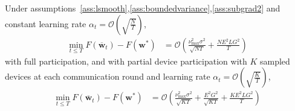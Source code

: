 
\begin{thm}
	Under assumptions~\ref{ass:lsmooth},\ref{ass:boundedvariance},\ref{ass:subgrad2} and constant learning
	rate $\alpha_{t}=\mathcal{O}(\sqrt{\frac{N}{T}})$, 
	\begin{align*}
	\min_{t\leq T}F(\overline{\mathbf{w}}_{t})-F(\mathbf{w}^{\ast}) & =\mathcal{O}\left(\frac{\nu_{\max}^{2}\sigma^{2}}{\sqrt{NT}}+\frac{NE^{2}LG^{2}}{T}\right)
	\end{align*}
	with full participation, and with partial device participation with $K$ sampled devices at
	each communication round and learning rate $\alpha_{t}=\mathcal{O}(\sqrt{\frac{K}{T}})$,
	\begin{align*}
	\min_{t\leq T}F(\overline{\mathbf{w}}_{t})-F(\mathbf{w}^{\ast}) & =\mathcal{O}\left(\frac{\nu_{\max}^{2}\sigma^{2}}{\sqrt{KT}}+\frac{E^{2}G^{2}}{\sqrt{KT}}+\frac{KE^{2}LG^{2}}{T}\right)
	\end{align*}
\end{thm}

